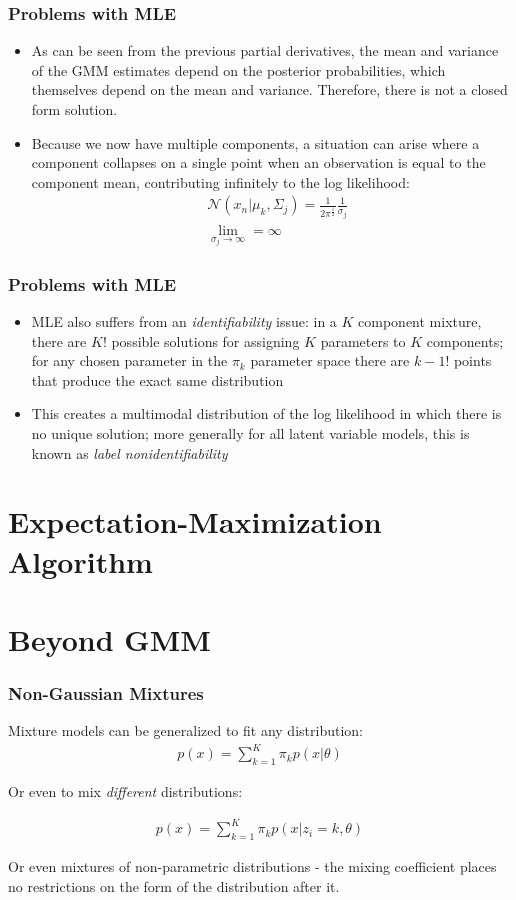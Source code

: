 \documentclass{beamer}
\begin{document}
\begin{frame}
\frametitle{Problems with MLE}
\begin{itemize}
	\item As can be seen from the previous partial derivatives, the mean and variance of the GMM estimates depend on the posterior probabilities, which themselves depend on the mean and variance. Therefore, there is not a closed form solution.
	\item Because we now have multiple components, a situation can arise where a component collapses on a single point when an observation is equal to the component mean, contributing infinitely to the log likelihood:
	\begin{align*}
	&\mathcal{N}(x_n|\mu_k, \Sigma_j) = \frac{1}{2\pi^{\frac{1}{2}}}\frac{1}{\sigma_j}\\ 
	&\lim_{\sigma_j \to \infty} = \infty
	\end{align*}
\end{itemize}

\end{frame}

\begin{frame}
\frametitle{Problems with MLE}
	\begin{itemize}
		\item MLE also suffers from an \textit{identifiability} issue: in a $K$ component mixture, there are $K!$ possible solutions for assigning $K$ parameters to $K$ components; for any chosen parameter in the $\pi_k$ parameter space there are $k-1!$ points that produce the exact same distribution
		\item This creates a multimodal distribution of the log likelihood in which there is no unique solution; more generally for all latent variable models, this is known as \textit{label nonidentifiability}
	\end{itemize}
\end{frame}

\section{Expectation-Maximization Algorithm}

\section{Beyond GMM}

\begin{frame}
\frametitle{Non-Gaussian Mixtures}
	Mixture models can be generalized to fit any distribution:
	\begin{align*}
	p(x) = \sum_{k=1}^{K} \pi_k p (x | \theta)
	\end{align*}
	
	Or even to mix \textit{different} distributions:
	
	\begin{align*}
	p(x) = \sum_{k=1}^{K} \pi_k p (x | z_i = k, \theta)
	\end{align*}
	
	Or even mixtures of non-parametric distributions - the mixing coefficient places no restrictions on the form of the distribution after it. 

\end{frame}
\end{document}

